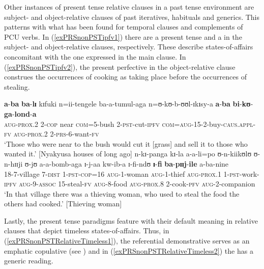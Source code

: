 Other instances of present tense relative clauses in a past tense environment are subject- and object-relative clauses of past iteratives, habituals and generics. This patterns with what has been found for temporal clauses and complements of PCU verbs. In (\ref{exPRSnonPSTipfv1}) there are a present tense  and a  in the subject- and object-relative clauses, respectively. These describe states-of-affairs concomitant with the one expressed in the main clause. In (\ref{exPRSnonPSTipfv2}), the present perfective in the object-relative clause construes the occurrences of cooking as taking place before the occurrences of stealing.
\begin{exe}
\ex \label{exPRSnonPSTipfv1} \gll \textbf{a}-\textbf{ba} \textbf{ba}-\textbf{lɪ} kɪfuki n=ii-tengele ba-a-tumul-aga n=ʊ-kʊ-b-ʊʊl-ɪkɪsy-a \textbf{a}-\textbf{ba} \textbf{bi}-\textbf{kʊ}-\textbf{ga}-\textbf{lond}-\textbf{a}\\
\textsc{aug}-\textsc{prox.2} 2-\textsc{cop} near \textsc{com}=5-bush 2-\textsc{pst}-cut-\textsc{ipfv} \textsc{com}=\textsc{aug}-15-2-buy-\textsc{caus.appl}-\textsc{fv} \textsc{aug}-\textsc{prox.2} 2-\textsc{prs}-6-want-\textsc{fv}\\
\glt \lq Those who were near to the bush would cut it [grass] and sell it to those who wanted it.' [Nyakyusa houses of long ago]
\ex \label{exPRSnonPSTipfv2} \gll n-kɪ-panga kɪ-la a-a-li=po ʊ-n-kiikʊlʊ ʊ-n-hɪɪji ʊ-jʊ a-a-bomb-aga ɪ-j-aa kw-ib-a ɪ-fi-ndʊ \textbf{ɪ}-\textbf{fi} \textbf{ba}-\textbf{pɪɪj}-\textbf{ile} a-ba-nine\\
18-7-village 7-\textsc{dist} 1-\textsc{pst}-\textsc{cop}=16 \textsc{aug}-1-woman \textsc{aug}-1-thief \textsc{aug}-\textsc{prox.1} 1-\textsc{pst}-work-\textsc{ipfv} \textsc{aug}-9-\textsc{assoc} 15-steal-\textsc{fv} \textsc{aug}-8-food \textsc{aug}-\textsc{prox.8} 2-cook-\textsc{pfv} \textsc{aug}-2-companion\\
\glt \lq In that village there was a thieving woman, who used to steal the food the others had cooked.' [Thieving woman]
\end{exe}

Lastly, the present tense paradigms feature with their default meaning in relative clauses that depict timeless states-of-affairs. Thus, in (\ref{exPRSnonPSTRelativeTimeless1}), the referential demonstrative serves as an emphatic copulative (see ) and in (\ref{exPRSnonPSTRelativeTimeless2}) the  has a generic reading.

